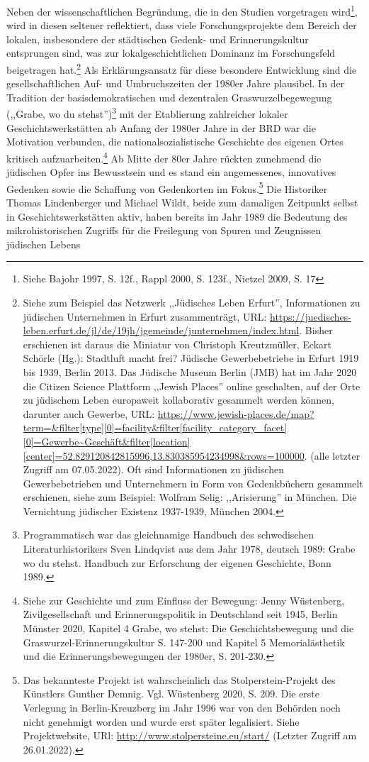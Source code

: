 Neben der wissenschaftlichen Begründung, die in den Studien vorgetragen wird\footnote{Siehe Bajohr 1997, S. 12f., Rappl 2000, S. 123f., Nietzel 2009, S. 17}, wird in diesen seltener reflektiert, dass viele Forschungsprojekte dem Bereich der lokalen, insbesondere der städtischen Gedenk- und Erinnerungskultur entsprungen sind, was zur lokalgeschichtlichen Dominanz im Forschungsfeld beigetragen hat.\footnote{Siehe zum Beispiel das Netzwerk ,,Jüdisches Leben Erfurt'', Informationen zu jüdischen Unternehmen in Erfurt zusammenträgt, URL: \url{https://juedisches-leben.erfurt.de/jl/de/19jh/jgemeinde/junternehmen/index.html}. Bisher erschienen ist daraus die Miniatur von Christoph Kreutzmüller, Eckart Schörle (Hg.): Stadtluft macht frei? Jüdische Gewerbebetriebe in Erfurt 1919 bis 1939, Berlin 2013. Das Jüdische Museum Berlin (JMB) hat im Jahr 2020 die Citizen Science Plattform ,,Jewish Places'' online geschalten, auf der Orte zu jüdischem Leben europaweit kollaborativ gesammelt werden können, darunter auch Gewerbe, URL: \url{https://www.jewish-places.de/map?term=&filter[type][0]=facility&filter[facility_category_facet][0]=Gewerbe~Geschäft&filter[location][center]=52.829120842815996,13.830385954234998&rows=100000}. (alle letzter Zugriff am 07.05.2022). Oft sind Informationen zu jüdischen Gewerbebetrieben und Unternehmern in Form von Gedenkbüchern gesammelt erschienen, siehe zum Beispiel: Wolfram Selig: ,,Arisierung'' in München. Die Vernichtung jüdischer Existenz 1937-1939, München 2004.} Als Erklärungsansatz für diese besondere Entwicklung sind die gesellschaftlichen Auf- und Umbruchszeiten der 1980er Jahre plausibel. In der Tradition der basisdemokratischen und dezentralen Graswurzelbegewegung (,,Grabe, wo du stehst'')\footnote{Programmatisch war das gleichnamige Handbuch des schwedischen Literaturhistorikers Sven Lindqvist aus dem Jahr 1978, deutsch 1989: Grabe wo du stehst. Handbuch zur Erforschung der eigenen Geschichte, Bonn 1989.} mit der Etablierung zahlreicher lokaler Geschichtswerkstätten ab Anfang der 1980er Jahre in der BRD war die Motivation verbunden, die nationalsozialistische Geschichte des eigenen Ortes kritisch aufzuarbeiten.\footnote{Siehe zur Geschichte und zum Einfluss der Bewegung: Jenny Wüstenberg, Zivilgesellschaft und Erinnerungspolitik in Deutschland seit 1945, Berlin Münster 2020, Kapitel 4 Grabe, wo stehst: Die Geschichtsbewegung und die Graswurzel-Erinnerungskultur S. 147-200 und Kapitel 5 Memorialästhetik und die Erinnerungsbewegungen der 1980er, S. 201-230.} Ab Mitte der 80er Jahre rückten zunehmend die jüdischen Opfer ins Bewusstsein und es stand ein angemessenes, innovatives Gedenken sowie die Schaffung von Gedenkorten im Fokus.\footnote{Das bekannteste Projekt ist wahrscheinlich das Stolperstein-Projekt des Künstlers Gunther Demnig. Vgl. Wüstenberg 2020, S. 209. Die erste Verlegung in Berlin-Kreuzberg im Jahr 1996 war von den Behörden noch nicht genehmigt worden und wurde erst später legalisiert. Siehe Projektwebsite, URl: \url{http://www.stolpersteine.eu/start/} (Letzter Zugriff am 26.01.2022).} Die Historiker Thomas Lindenberger und Michael Wildt, beide zum damaligen Zeitpunkt selbst in Geschichtswerkstätten aktiv, haben bereits im Jahr 1989 die Bedeutung des mikrohistorischen Zugriffs für die Freilegung von Spuren und Zeugnissen jüdischen Lebens 